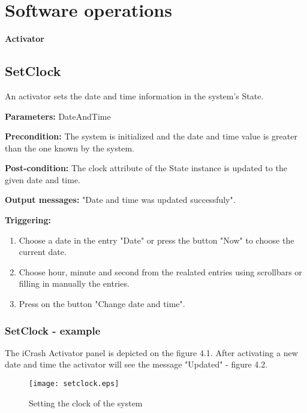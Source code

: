 \chapter{Software operations}
\label{chap:soptware_operations}

\begin{center}
	{\bf \Large Activator}
\end{center}

\section{SetClock}
\label{operation:CloseCrisis}
An activator sets the date and time information in the system's State.
\begin{description}
	\item \textbf{Parameters:} DateAndTime
	\item \textbf{Precondition:} The system is initialized and the date and time
	value is greater than the one known by the system.
	\item \textbf{Post-condition:} The clock attribute of the State instance is
	updated to the given date and time.
	\item \textbf{Output messages:} "Date and time was updated
	successfuly".
	
	\item \textbf{Triggering:}
	
	\begin{enumerate}
		\item Choose a date in the entry "Date" or press the button "Now" to choose
		the current date.
		\item Choose hour, minute and second from the realated entries using
		scrollbars or filling in manually the entries.
		\item Press on the button "Change date and time".
	\end{enumerate}
\end{description}

\subsection{SetClock - example}

The iCrash Activator panel is depicted on the figure 4.1. After activating a new
date and time the activator will see the message "Updated" - figure 4.2. 

\begin{figure}[h]
    \texttt{[image: setclock.eps]}
	\caption{Setting the clock of the system}
\end{figure}

